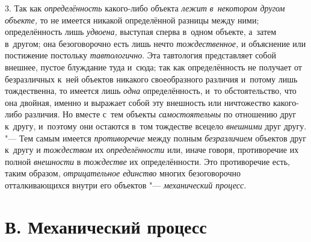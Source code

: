 3. Так как {\em определённость} какого-либо объекта {\em лежит}
{\em в~некотором другом объекте,}
то не имеется никакой определённой разницы между ними;
определённость лишь {\em удвоена,}
выступая сперва в~одном объекте, а~затем в~другом; она
безоговорочно есть лишь нечто {\em тождественное,} и
объяснение или постижение постольку {\em тавтологично}. Эта
тавтология представляет собой внешнее, пустое блуждание туда и~сюда; так
как определённость не получает от безразличных к~ней объектов никакого
своеобразного различия и~потому лишь тождественна, то имеется лишь {\em одна}
определённость, и~то обстоятельство, что она двойная, именно
и выражает собой эту внешность или ничтожество какого-либо различия. Но
вместе с~тем объекты {\em самостоятельны} по
отношению друг к~другу, и~поэтому они остаются в~том тождестве всецело
{\em внешними} друг другу. "--- Тем самым имеется {\em противоречие} между
полным {\em безразличием} объектов друг к~другу и {\em тождеством} их
{\em определённости} или, иначе говоря, противоречие их полной
{\em внешности} в {\em тождестве} их определённости. Это противоречие есть,
таким образом, {\em отрицательное единство} многих безоговорочно
отталкивающихся внутри его объектов "--- {\em механический процесс}.

\section[В. Механический процесс]{В. Механический процесс}

